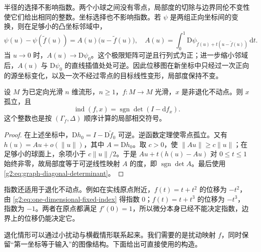 半径的选择不影响指数。两个小球之间没有零点，局部度的切除与边界同伦不变性使它们给出相同的整数。坐标选择也不影响指数。若 \(\psi\) 是两组正向坐标间的变换，则在足够小的凸坐标邻域中，
\[
	\psi(u)-\psi(\widetilde f(u))
	=A(u)\bigl(u-\widetilde f(u)\bigr),
	\quad
	A(u)=\int_0^1\mathrm{D}\psi_{\widetilde f(u)+t(u-\widetilde f(u))}\,\mathrm{d}t.
\]
当 \(u\to0\) 时，\(A(u)\to\mathrm{D}\psi_0\)。这个极限矩阵可逆且行列式为正；进一步缩小邻域后，\(A(u)\) 与 \(\mathrm{D}\psi_0\) 的直线插值处处可逆。因此位移图在新坐标中只经过一次正向的源坐标变化，以及一次不经过零点的目标线性变形，局部度保持不变。

\begin{proposition}\label{g2:prop:nondegenerate-fixed-index}
	设 \(M\) 为已定向光滑 \(n\) 维流形，\(n\geq1\)，\(f:M\to M\) 光滑，\(x\) 是非退化不动点。则 \(x\) 孤立，且
	\[
		\operatorname{ind}(f,x)=\operatorname{sgn}\det(I-\mathrm{d}f_x).
	\]
	这个整数也是按 \((\Gamma_f,\Delta)\) 顺序计算的局部相交符号。
\end{proposition}
\begin{proof}
	在上述坐标中，\(\mathrm{D}h_0=I-\mathrm{D}\widetilde f_0\) 可逆。逆函数定理使零点孤立。又有 \(h(u)=Au+o(\lVert u\rVert)\)，其中 \(A=\mathrm{D}h_0\)。取 \(c>0\)，使 \(\lVert Au\rVert\geq c\lVert u\rVert\)；在足够小的球面上，余项小于 \(c\lVert u\rVert/2\)。于是 \(Au+t(h(u)-Au)\) 对 \(0\leq t\leq1\) 始终非零，故局部度等于可逆线性映射 \(A\) 的度，即 \(\operatorname{sgn}\det A\)。最后使用 \eqref{g2:eq:graph-diagonal-determinant}。
\end{proof}

指数还适用于退化不动点。例如在实线原点附近，\(f(t)=t+t^2\) 的位移为 \(-t^2\)，由 \eqref{g2:eq:one-dimensional-fixed-index} 得指数 \(0\)；\(f(t)=t+t^3\) 的位移为 \(-t^3\)，指数为 \(-1\)。两者在原点都满足 \(f'(0)=1\)，所以微分本身已经不能决定指数，边界上的位移仍能决定它。

\ProseParagraphBreak

退化情形可以通过小扰动与横截情形联系起来。我们需要的是扰动映射 \(f\)，同时保留“第一坐标等于输入”的图像结构。下面给出可直接使用的构造。

